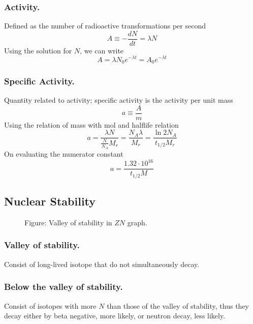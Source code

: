 \documentclass[../../../main.tex]{subfiles}
\begin{document}
\subsubsection*{Activity.} Defined as the number of radioactive transformations per second
\begin{equation*}
    A\equiv-\frac{dN}{dt}=\lambda N
\end{equation*}
Using the solution for $N$, we can write
\begin{equation*}
    A=\lambda N_0 e^{-\lambda t}=A_0e^{-\lambda t}
\end{equation*}

\subsubsection*{Specific Activity.} Quantity related to activity; specific activity is the activity per unit mass
\begin{equation*}
    a\equiv\frac{A}{m}
\end{equation*}
Using the relation of mass with mol and halflife relation
\begin{equation*}
    a=\frac{\lambda N}{\frac{N}{N_A}M_r}=\frac{N_A \lambda }{M_r}=\frac{\ln 2 N_A}{t_{1/2}M_r}
\end{equation*}
On evaluating the numerator constant
\begin{equation*}
    a=\frac{1.32\cdot 10^{16}}{t_{1/2}M}
\end{equation*}
\subsection*{Nuclear Stability}
\begin{figure*}[h]
    \centering
    \caption*{Figure: Valley of stability in $ZN$ graph.}
\end{figure*}

\subsubsection*{Valley of stability.}  Consist of long-lived isotope that do not simultaneously decay.

\subsubsection*{Below the valley of stability.} Consist of isotopes with more $N$ than those of the valley of stability, thus they decay either by beta negative, more likely, or neutron decay, less likely.
\end{document}
